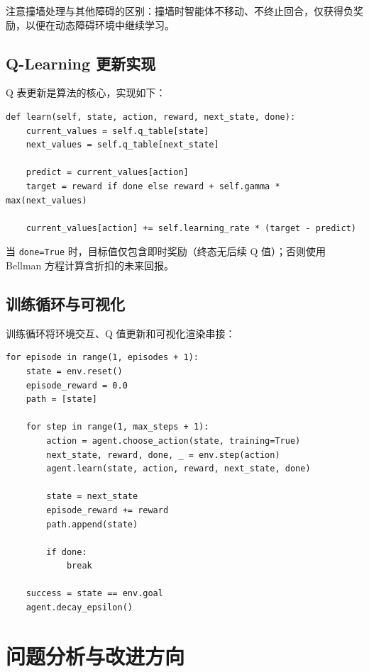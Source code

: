 \documentclass[UTF8,12pt,a4paper]{ctexart}
\begin{document}
注意撞墙处理与其他障碍的区别：撞墙时智能体不移动、不终止回合，仅获得负奖励，以便在动态障碍环境中继续学习。

\subsection{Q-Learning 更新实现}
Q 表更新是算法的核心，实现如下：

\begin{lstlisting}[caption={Q-Learning 更新逻辑}]
def learn(self, state, action, reward, next_state, done):
    current_values = self.q_table[state]
    next_values = self.q_table[next_state]

    predict = current_values[action]
    target = reward if done else reward + self.gamma * max(next_values)

    current_values[action] += self.learning_rate * (target - predict)
\end{lstlisting}

当 \texttt{done=True} 时，目标值仅包含即时奖励（终态无后续 Q 值）；否则使用 Bellman 方程计算含折扣的未来回报。

\subsection{训练循环与可视化}
训练循环将环境交互、Q 值更新和可视化渲染串接：

\begin{lstlisting}[caption={训练循环主框架}]
for episode in range(1, episodes + 1):
    state = env.reset()
    episode_reward = 0.0
    path = [state]

    for step in range(1, max_steps + 1):
        action = agent.choose_action(state, training=True)
        next_state, reward, done, _ = env.step(action)
        agent.learn(state, action, reward, next_state, done)

        state = next_state
        episode_reward += reward
        path.append(state)

        if done:
            break

    success = state == env.goal
    agent.decay_epsilon()
\end{lstlisting}

\section{问题分析与改进方向}
\end{document}

